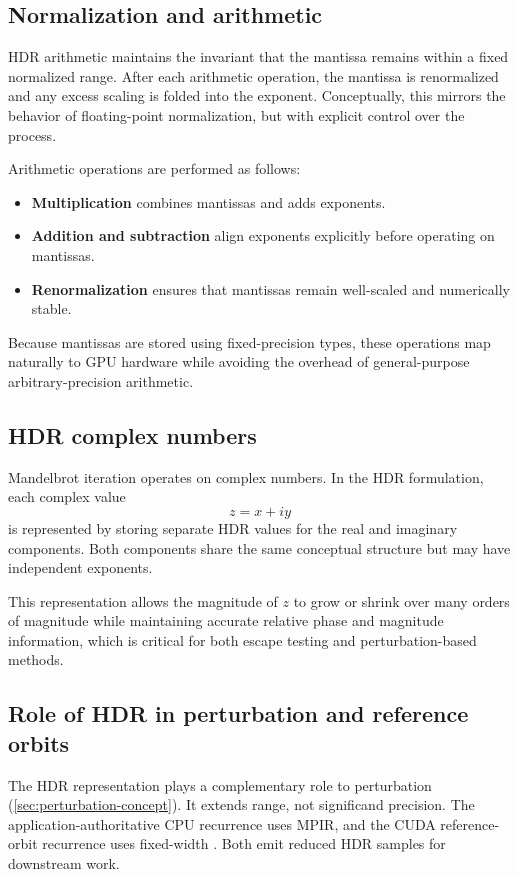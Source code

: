 \subsection{Normalization and arithmetic}

HDR arithmetic maintains the invariant that the mantissa remains within a fixed
normalized range. After each arithmetic operation, the mantissa is renormalized
and any excess scaling is folded into the exponent. Conceptually, this mirrors
the behavior of floating-point normalization, but with explicit control over the
process.

Arithmetic operations are performed as follows:
\begin{itemize}
\item \textbf{Multiplication} combines mantissas and adds exponents.
\item \textbf{Addition and subtraction} align exponents explicitly before
      operating on mantissas.
\item \textbf{Renormalization} ensures that mantissas remain well-scaled and
      numerically stable.
\end{itemize}

Because mantissas are stored using fixed-precision types, these operations map
naturally to GPU hardware while avoiding the overhead of general-purpose
arbitrary-precision arithmetic.

\subsection{HDR complex numbers}

Mandelbrot iteration operates on complex numbers. In the HDR formulation, each
complex value
\[
z = x + i y
\]
is represented by storing separate HDR values for the real and imaginary
components. Both components share the same conceptual structure but may have
independent exponents.

This representation allows the magnitude of \(z\) to grow or shrink over many
orders of magnitude while maintaining accurate relative phase and magnitude
information, which is critical for both escape testing and perturbation-based
methods.

\subsection{Role of HDR in perturbation and reference orbits}

The HDR representation plays a complementary role to perturbation
(\cref{sec:perturbation-concept}).  It extends range, not significand precision.
The application-authoritative CPU recurrence uses MPIR, and the CUDA
reference-orbit recurrence uses fixed-width .  Both emit
reduced HDR samples for downstream work.

